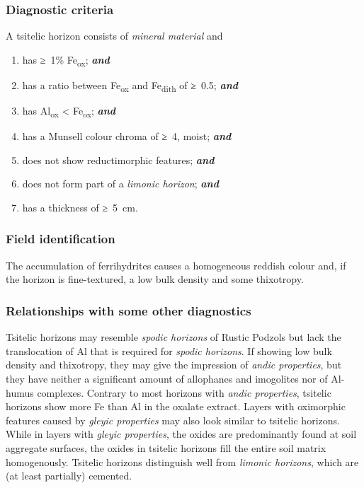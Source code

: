 \documentclass[
  letterpaper,
  DIV=11,
  numbers=noendperiod]{scrreprt}
\begin{document}
\hypertarget{diagnostic-criteria-37}{%
\subsubsection{Diagnostic criteria}\label{diagnostic-criteria-37}}

A tsitelic horizon consists of \emph{mineral material} and

\begin{enumerate}
\def\labelenumi{\arabic{enumi}.}
\item
  has ≥~1\% Fe\textsubscript{ox}; \textbf{\emph{and}}
\item
  has a ratio between Fe\textsubscript{ox} and Fe\textsubscript{dith} of
  ≥~0.5; \textbf{\emph{and}}
\item
  has Al\textsubscript{ox} \textless{} Fe\textsubscript{ox};
  \textbf{\emph{and}}
\item
  has a Munsell colour chroma of ≥~4, moist; \textbf{\emph{and}}
\item
  does not show reductimorphic features; \textbf{\emph{and}}
\item
  does not form part of a \emph{limonic horizon}; \textbf{\emph{and}}
\item
  has a thickness of ≥~5~cm.
\end{enumerate}

\hypertarget{field-identification-29}{%
\subsubsection{Field identification}\label{field-identification-29}}

The accumulation of ferrihydrites causes a homogeneous reddish colour
and, if the horizon is fine-textured, a low bulk density and some
thixotropy.

\hypertarget{relationships-with-some-other-diagnostics-36}{%
\subsubsection{Relationships with some other
diagnostics}\label{relationships-with-some-other-diagnostics-36}}

Tsitelic horizons may resemble \emph{spodic horizons} of Rustic Podzols
but lack the translocation of Al that is required for \emph{spodic
horizons}. If showing low bulk density and thixotropy, they may give the
impression of \emph{andic properties}, but they have neither a
significant amount of allophanes and imogolites nor of Al-humus
complexes. Contrary to most horizons with \emph{andic properties},
tsitelic horizons show more Fe than Al in the oxalate extract. Layers
with oximorphic features caused by \emph{gleyic properties} may also
look similar to tsitelic horizons. While in layers with \emph{gleyic
properties}, the oxides are predominantly found at soil aggregate
surfaces, the oxides in tsitelic horizons fill the entire soil matrix
homogenously. Tsitelic horizons distinguish well from \emph{limonic
horizons}, which are (at least partially) cemented.
\end{document}
